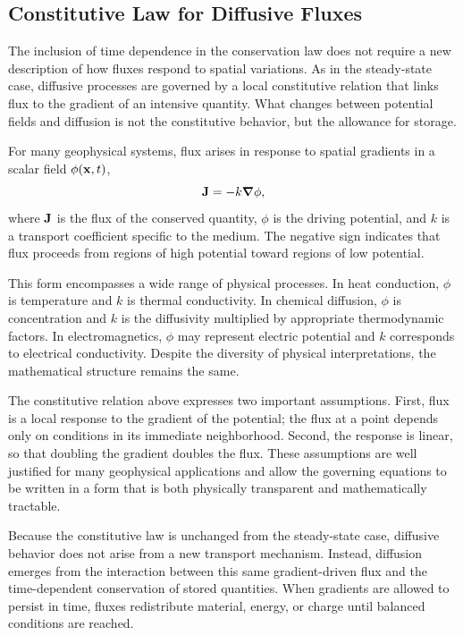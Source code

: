 \subsection{Constitutive Law for Diffusive Fluxes}

The inclusion of time dependence in the conservation law does not require a new description of how fluxes respond to spatial variations. As in the steady-state case, diffusive processes are governed by a local constitutive relation that links flux to the gradient of an intensive quantity. What changes between potential fields and diffusion is not the constitutive behavior, but the allowance for storage.

For many geophysical systems, flux arises in response to spatial gradients in a
scalar field $\phi(\vb{x},t)$,
\[
    \vb{J} = -k \grad \phi,
\]
where $\vb{J}$ is the flux of the conserved quantity, $\phi$ is the driving potential, and $k$ is a transport coefficient specific to the medium. The negative sign indicates that flux proceeds from regions of high potential toward regions of low potential.

This form encompasses a wide range of physical processes. In heat conduction, $\phi$ is temperature and $k$ is thermal conductivity. In chemical diffusion, $\phi$ is concentration and $k$ is the diffusivity multiplied by appropriate thermodynamic factors. In electromagnetics, $\phi$ may represent electric potential and $k$ corresponds to electrical conductivity. Despite the diversity of physical interpretations, the mathematical structure remains the same.

The constitutive relation above expresses two important assumptions. First, flux is a local response to the gradient of the potential; the flux at a point depends only on conditions in its immediate neighborhood. Second, the response is linear, so that doubling the gradient doubles the flux. These assumptions are well justified for many geophysical applications and allow the governing equations to be written in a form that is both physically transparent and mathematically tractable.

Because the constitutive law is unchanged from the steady-state case, diffusive behavior does not arise from a new transport mechanism. Instead, diffusion emerges from the interaction between this same gradient-driven flux and the time-dependent conservation of stored quantities. When gradients are allowed to persist in time, fluxes redistribute material, energy, or charge until balanced conditions are reached.

